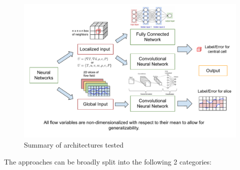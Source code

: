 \documentclass{article}
\begin{document}
\begin{figure}
    \centering
    \includegraphics[width=\textwidth]{figures/NNs.pdf}
    \caption{Summary of architectures tested}
\end{figure}

The approaches can be broadly split into the following 2 categories:
\end{document}
